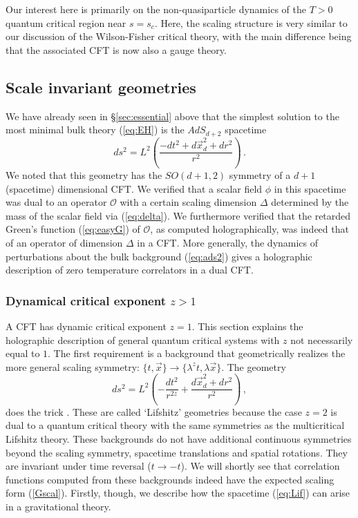 \documentclass[10pt, oneside]{book}
\def\be{\begin{equation}}
\def\ee{\end{equation}}
\def\ocal{{\mathcal{O}}}
\begin{document}
\begin{doublespace}
Our interest here is primarily on the non-quasiparticle dynamics of the 
$T>0$ quantum critical region near $s=s_c$. Here, the scaling structure is very similar to our discussion of the Wilson-Fisher critical theory,
with the main difference being that the associated CFT is now also a gauge theory.


\subsection{Scale invariant geometries}
\label{sec:scaling}

We have already seen in \S\ref{sec:essential} above that the simplest solution to the most minimal bulk theory (\ref{eq:EH}) is the $AdS_{d+2}$ spacetime
\be\label{eq:ads2}
ds^2 = L^2 \left( \frac{- dt^2 + d\vec x^2_{d} + dr^2}{r^2} \right) \,.
\ee
We noted that this geometry has the $SO(d+1,2)$ symmetry of a $d+1$ (spacetime) dimensional CFT. We verified that a scalar field $\phi$ in this spacetime was dual to an operator $\ocal$ with a certain scaling dimension $\Delta$ determined by the mass of the scalar field via (\ref{eq:delta}). We furthermore verified that the retarded Green's function (\ref{eq:easyG}) of $\ocal$, as computed holographically, was indeed that of an operator of dimension $\Delta$ in a CFT. More generally, the dynamics of perturbations about the bulk background (\ref{eq:ads2}) gives a holographic description of zero temperature correlators in a dual CFT.

\subsubsection{Dynamical critical exponent $z>1$}

A CFT has dynamic critical exponent $z=1$. This section explains the holographic description of general quantum critical systems with $z$ not necessarily equal to $1$. The first requirement is a background that geometrically realizes the more general scaling symmetry: $\{t, \vec x \} \to \{\lambda^z t , \lambda \vec x \}$. The geometry
\be\label{eq:Lif}
ds^2 = L^2 \left(- \frac{dt^2}{r^{2z}} + \frac{d\vec x^2_{d} + dr^2}{r^2} \right) \,,
\ee
does the trick \cite{Kachru:2008yh}. These are called `Lifshitz' geometries because the case $z=2$ is dual to a quantum critical theory with the same symmetries as the multicritical Lifshitz theory. These backgrounds do not have additional continuous symmetries beyond the scaling symmetry, spacetime translations and spatial rotations. They are invariant under time reversal ($t \to -t$). We will shortly see that correlation functions computed from these backgrounds indeed have the expected scaling form (\ref{Gscal}). Firstly, though, we describe how the spacetime (\ref{eq:Lif}) can arise in a gravitational theory.


\end{doublespace}
\end{document}
